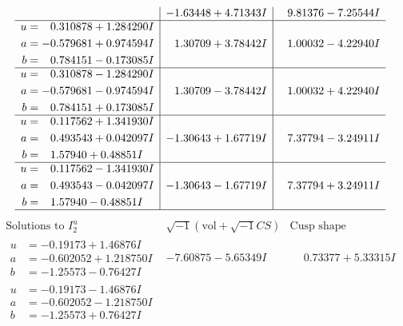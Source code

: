 \documentclass[1p]{elsarticle_modified}
\theoremstyle{definition}
\newcommand{\I}{\sqrt{-1}}
\begin{document}
$$\begin{array}{c|c|c}
 & -1.63448 + 4.71343 I & \phantom{-}9.81376 - 7.25544 I \\ \hline\begin{aligned}
u &= \phantom{-}0.310878 + 1.284290 I \\
a &= -0.579681 + 0.974594 I \\
b &= \phantom{-}0.784151 - 0.173085 I\end{aligned}
 & \phantom{-}1.30709 + 3.78442 I & \phantom{-}1.00032 - 4.22940 I \\ \hline\begin{aligned}
u &= \phantom{-}0.310878 - 1.284290 I \\
a &= -0.579681 - 0.974594 I \\
b &= \phantom{-}0.784151 + 0.173085 I\end{aligned}
 & \phantom{-}1.30709 - 3.78442 I & \phantom{-}1.00032 + 4.22940 I \\ \hline\begin{aligned}
u &= \phantom{-}0.117562 + 1.341930 I \\
a &= \phantom{-}0.493543 + 0.042097 I \\
b &= \phantom{-}1.57940 + 0.48851 I\end{aligned}
 & -1.30643 + 1.67719 I & \phantom{-}7.37794 - 3.24911 I \\ \hline\begin{aligned}
u &= \phantom{-}0.117562 - 1.341930 I \\
a &= \phantom{-}0.493543 - 0.042097 I \\
b &= \phantom{-}1.57940 - 0.48851 I\end{aligned}
 & -1.30643 - 1.67719 I & \phantom{-}7.37794 + 3.24911 I\\
 \hline 
 \end{array}$$\newpage$$\begin{array}{c|c|c}  
\text{Solutions to }I^u_{2}& \I (\text{vol} + \sqrt{-1}CS) & \text{Cusp shape}\\
 \hline 
\begin{aligned}
u &= -0.19173 + 1.46876 I \\
a &= -0.602052 + 1.218750 I \\
b &= -1.25573 - 0.76427 I\end{aligned}
 & -7.60875 - 5.65349 I & \phantom{-}0.73377 + 5.33315 I \\ \hline\begin{aligned}
u &= -0.19173 - 1.46876 I \\
a &= -0.602052 - 1.218750 I \\
b &= -1.25573 + 0.76427 I\end{aligned}

\end{array}$$
\end{document}
